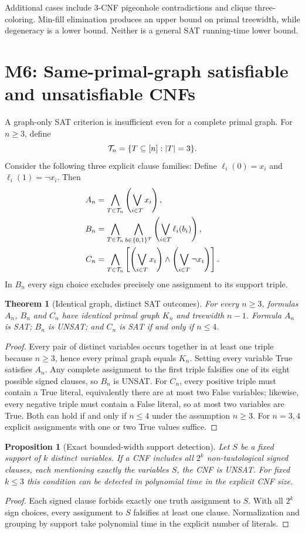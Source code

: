 \documentclass[11pt,a4paper]{article}
\newtheorem{theorem}{Theorem}
\newtheorem{proposition}{Proposition}
\begin{document}
Additional cases include 3-CNF pigeonhole contradictions and
clique three-coloring. Min-fill elimination produces an upper
bound on primal treewidth, while degeneracy is a lower bound.
Neither is a general SAT running-time lower bound.


\section{M6: Same-primal-graph satisfiable and unsatisfiable CNFs}

A graph-only SAT criterion is insufficient even for a complete primal graph.
For $n\ge3$, define
\[
{\cal T}_n=\{T\subseteq[n]:|T|=3\}.
\]
Consider the following three explicit clause families:
Define $\ell_i(0)=x_i$ and $\ell_i(1)=\neg x_i$.
Then
\begin{align}
A_n &= \bigwedge_{T\in{\cal T}_n}
          \left(\bigvee_{i\in T}x_i\right),\\
B_n &= \bigwedge_{T\in{\cal T}_n}
       \bigwedge_{b\in\{0,1\}^{T}}
        \left(\bigvee_{i\in T}\ell_i(b_i)\right),\\
C_n &= \bigwedge_{T\in{\cal T}_n}
       \left[
       \left(\bigvee_{i\in T}x_i\right)
       \wedge\left(\bigvee_{i\in T}\neg x_i\right)
       \right].
\end{align}
In $B_n$ every sign choice excludes precisely one assignment
to its support triple.

\begin{theorem}[Identical graph, distinct SAT outcomes]
For every $n\ge3$, formulas $A_n$, $B_n$ and $C_n$ have
identical primal graph $K_n$ and treewidth $n-1$.
Formula $A_n$ is SAT; $B_n$ is UNSAT; and
$C_n$ is SAT if and only if $n\le4$.
\end{theorem}
\begin{proof}
Every pair of distinct variables occurs together in at least
one triple because $n\ge3$, hence every primal graph equals
$K_n$. Setting every variable True satisfies $A_n$.
Any complete assignment to the first triple falsifies one of
its eight possible signed clauses, so $B_n$ is UNSAT.
For $C_n$, every positive triple must contain a True literal,
equivalently there are at most two False variables; likewise,
every negative triple must contain a False literal, so at most
two variables are True. Both can hold if and only if $n\le4$
under the assumption $n\ge3$. For $n=3,4$ explicit
assignments with one or two True values suffice.
\end{proof}

\begin{proposition}[Exact bounded-width support detection]
Let $S$ be a fixed support of $k$ distinct variables.
If a CNF includes all $2^k$ non-tautological signed clauses,
each mentioning exactly the variables $S$, the CNF is UNSAT.
For fixed $k\le3$ this condition can be detected in polynomial
time in the explicit CNF size.
\end{proposition}
\begin{proof}
Each signed clause forbids exactly one truth assignment to $S$.
With all $2^k$ sign choices, every assignment to $S$ falsifies
at least one clause. Normalization and grouping by support
take polynomial time in the explicit number of literals.
\end{proof}
\end{document}
